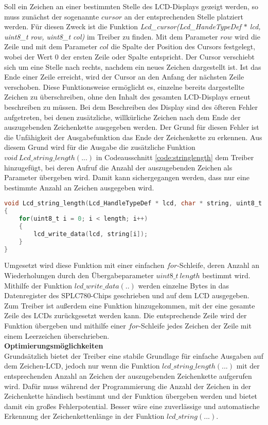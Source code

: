 Soll ein Zeichen an einer bestimmten Stelle des LCD-Displays gezeigt werden, so muss zunächst der sogenannte $cursor$ an der entsprechenden Stelle platziert werden. Für diesen Zweck ist die Funktion \textit{Lcd\_cursor(Lcd\_HandeTypeDef $*$ lcd, uint8\_t row, uint8\_t col)} im Treiber zu finden. Mit dem Parameter $row$ wird die Zeile und mit dem Parameter $col$ die Spalte der Position des Cursors festgelegt, wobei der Wert 0 der ersten Zeile oder Spalte entspricht. Der Cursor verschiebt sich um eine Stelle nach rechts, nachdem ein neues Zeichen dargestellt ist. Ist das Ende einer Zeile erreicht, wird der Cursor an den Anfang der nächsten Zeile verschoben. Diese Funktionsweise ermöglicht es, einzelne bereits dargestellte Zeichen zu überschreiben, ohne den Inhalt des gesamten LCD-Displays erneut beschreiben zu müssen.
\newline
Bei dem Beschreiben des Display sind des öfteren Fehler aufgetreten, bei denen zusätzliche, willkürliche Zeichen nach dem Ende der auszugebenden Zeichenkette ausgegeben werden. Der Grund für diesen Fehler ist die Unfähigkeit der Ausgabefunktion das Ende der Zeichenkette zu erkennen. Aus diesem Grund wird für die Ausgabe die zusätzliche Funktion $void\ Lcd\_string\_length(...)$ in Codeausschnitt \ref{code:stringlength} dem Treiber hinzugefügt, bei deren Aufruf die Anzahl der auszugebenden Zeichen als Parameter übergeben wird. Damit kann sichergegangen werden, dass nur eine bestimmte Anzahl an Zeichen ausgegeben wird.
\begin{lstlisting}[firstnumber=95, language=C, caption = lcd.c: Funktion Lcd\_string\_length(...), label = code:stringlength]
void Lcd_string_length(Lcd_HandleTypeDef * lcd, char * string, uint8_t length)
{
	for(uint8_t i = 0; i < length; i++)
	{
		lcd_write_data(lcd, string[i]);
	}
}
\end{lstlisting}
Umgesetzt wird diese Funktion mit einer einfachen $for$-Schleife, deren Anzahl an Wiederholungen durch den Übergabeparameter $uint8\_t\ length$ bestimmt wird. Mithilfe der Funktion $lcd\_write\_data(..)$ werden einzelne Bytes in das Datenregister des SPLC780-Chips geschrieben und auf dem LCD ausgegeben.
Zum Treiber ist außerdem eine Funktion hinzugekommen, mit der eine gesamte Zeile des LCDs zurückgesetzt werden kann. Die entsprechende Zeile wird der Funktion übergeben und mithilfe einer $for$-Schleife jedes Zeichen der Zeile mit einem Leerzeichen überschrieben.\\
\newline
\textbf{Optimierungsmöglichkeiten}\\
Grundsätzlich bietet der Treiber eine stabile Grundlage für einfache Ausgaben auf dem Zeichen-LCD, jedoch nur wenn die Funktion $lcd\_string\_length(...)$ mit der entsprechenden Anzahl an Zeichen der auszugebenden Zeichenkette aufgerufen wird. Dafür muss während der Programmierung die Anzahl der Zeichen in der Zeichenkette händisch bestimmt und der Funktion übergeben werden und bietet damit ein großes Fehlerpotential. Besser wäre eine zuverlässige und automatische Erkennung der Zeichenkettenlänge in der Funktion $lcd\_string(...)$.